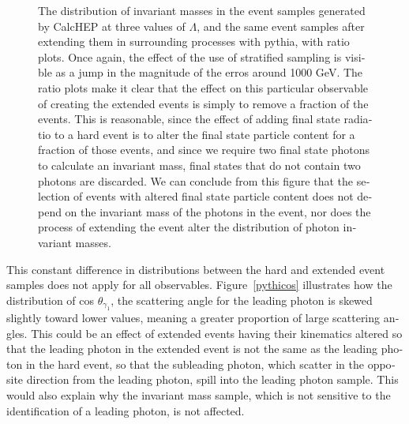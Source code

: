 \begin{english}
\begin{figure}[htp]
\centering
\begin{minipage}[b]{.69\textwidth}\hspace{-1.5em}\makebox[0pt][l]{
\noindent\begin{infilsf}
\tiny

\end{infilsf}}
\end{minipage}\hfill
\caption{The distribution of invariant masses in the event samples generated by CalcHEP at three values of $\Lambda$, and the same event samples after extending them in surrounding processes with pythia, with ratio plots. Once again, the effect of the use of stratified sampling is visible as a jump in the magnitude of the erros around 1000 GeV. The ratio plots make it clear that the effect on this particular observable of creating the extended events is simply to remove a fraction of the events. This is reasonable, since the effect of adding final state radiatio to a hard event is to alter the final state particle content for a fraction of those events, and since we require two final state photons to calculate an invariant mass, final states that do not contain two photons are discarded. We can conclude from this figure that the selection of events with altered final state particle content does not depend on the invariant mass of the photons in the event, nor does the process of extending the event alter the distribution of photon invariant masses.
\label{pythify}}
\end{figure}

This constant difference in distributions between the hard and extended event samples does not apply for all observables. Figure~\ref{pythicos} illustrates how the distribution of cos $\theta_{\gamma_1}$, the scattering angle for the leading photon is skewed slightly toward lower values, meaning a greater proportion of large scattering angles. This could be an effect of extended events having their kinematics altered so that the leading photon in the extended event is not the same as the leading photon in the hard event, so that the subleading photon, which scatter in the opposite direction from the leading photon, spill into the leading photon sample. This would also explain why the invariant mass sample, which is not sensitive to the identification of a leading photon, is not affected.


\end{english}
